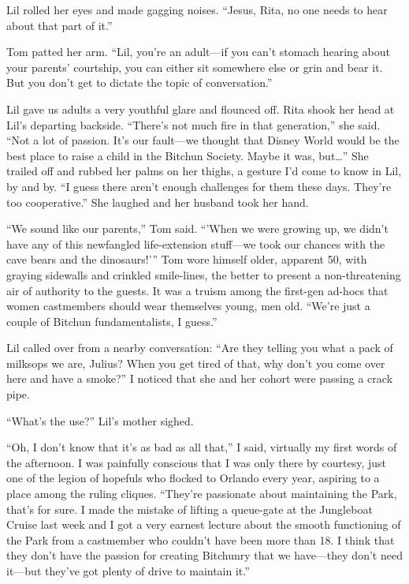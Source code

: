 Lil rolled her eyes and made gagging noises. “Jesus, Rita, no one
needs to hear about that part of it.”

Tom patted her arm. “Lil, you're an adult—if you can't stomach
hearing about your parents' courtship, you can either sit somewhere
else or grin and bear it. But you don't get to dictate the topic of
conversation.”

Lil gave us adults a very youthful glare and flounced off. Rita
shook her head at Lil's departing backside. “There's not much fire
in that generation,” she said. “Not a lot of passion. It's our
fault—we thought that Disney World would be the best place to raise
a child in the Bitchun Society. Maybe it was, but…” She trailed off
and rubbed her palms on her thighs, a gesture I'd come to know in
Lil, by and by. “I guess there aren't enough challenges for them
these days. They're too cooperative.” She laughed and her husband
took her hand.

“We sound like our parents,” Tom said. “'When we were growing up,
we didn't have any of this newfangled life-extension stuff—we took
our chances with the cave bears and the dinosaurs!'” Tom wore
himself older, apparent 50, with graying sidewalls and crinkled
smile-lines, the better to present a non-threatening air of
authority to the guests. It was a truism among the first-gen
ad-hocs that women castmembers should wear themselves young, men
old. “We're just a couple of Bitchun fundamentalists, I guess.”

Lil called over from a nearby conversation: “Are they telling you
what a pack of milksops we are, Julius? When you get tired of that,
why don't you come over here and have a smoke?” I noticed that she
and her cohort were passing a crack pipe.

“What's the use?” Lil's mother sighed.

“Oh, I don't know that it's as bad as all that,” I said, virtually
my first words of the afternoon. I was painfully conscious that I
was only there by courtesy, just one of the legion of hopefuls who
flocked to Orlando every year, aspiring to a place among the ruling
cliques. “They're passionate about maintaining the Park, that's for
sure. I made the mistake of lifting a queue-gate at the Jungleboat
Cruise last week and I got a very earnest lecture about the smooth
functioning of the Park from a castmember who couldn't have been
more than 18. I think that they don't have the passion for creating
Bitchunry that we have—they don't need it—but they've got plenty of
drive to maintain it.”

